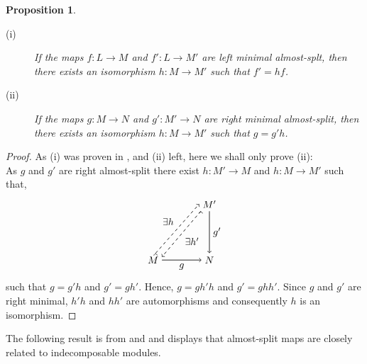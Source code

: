 \documentclass[11.5pt, twoside, a4paper, titlepage]{report}
\theoremstyle{definition}
\theoremstyle{plain}
\newtheorem{prop}[mydef]{Proposition}
\begin{document}
\begin{prop}
\begin{description}
\item [(i)] If the maps $f: L \to M$ and $f': L \to M'$ are left minimal almost-splt, then there exists an isomorphism $h: M \to M'$ such that $f'=hf$.
\item [(ii)] If the maps $g: M \to N$ and $g': M' \to N$ are right minimal almost-split, then there exists an isomorphism $h: M \to M'$ such that $g=g'h$.
\end{description}
\end{prop}
\begin{proof}
As (i) was proven in \cite{Assem}, and (ii) left, here we shall only prove (ii):\\
As $g$ and $g'$ are right almost-split there exist $h: M' \to M$ and $h:M \to M'$ such that,
\begin{equation*}
\begin{tikzpicture}[->,-latex, auto, main path/.style={->, semithick}, main node/.style={}]
\node	[main node]		(1) at (0,0)		{$M$};
\node [main node]		(2) at (2, 0)		{$N$};
\node [main node]		(3) at (2,2)		{$M'$};

\draw (1) [main path] edge node [auto, swap] {$g$} (2);
\draw (3) [main path] edge node [auto] {$g'$} (2);
\draw (3.220) [->, dashed, semithick] edge node [auto] {$\exists h'$} (1.20);
\draw (1.70) [->, dashed, semithick] edge node [auto] {$\exists h$} (3.180);
\end{tikzpicture}
\end{equation*}
such that $g=g'h$ and $g'=gh'$. Hence, $g=gh'h$ and $g'=ghh'$. Since $g$ and $g'$ are right minimal, $h'h$ and $hh'$ are automorphisms and consequently $h$ is an isomorphism.
\end{proof}

The following result is from \cite{Vale} and \cite{Assem} and displays that almost-split maps are closely related to indecomposable modules.
\end{document}
